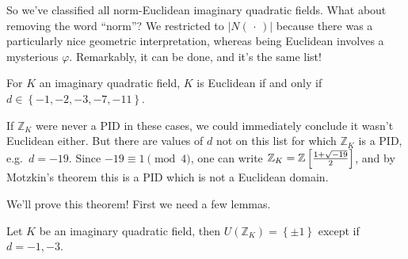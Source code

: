\begin{remark}

So we've classified all norm-Euclidean imaginary quadratic fields. What
about removing the word ``norm''? We restricted to
\({\left\lvert {N({\,\cdot\,})} \right\rvert}\) because there was a
particularly nice geometric interpretation, whereas being Euclidean
involves a mysterious \(\varphi\). Remarkably, it can be done, and it's
the same list!

\end{remark}

\begin{theorem}[Motzkin]

For \(K\) an imaginary quadratic field, \(K\) is Euclidean if and only
if \(d\in \left\{{-1,-2,-3,-7,-11}\right\}\).

\end{theorem}

\begin{remark}

If \({\mathbb{Z}}_K\) were never a PID in these cases, we could
immediately conclude it wasn't Euclidean either. But there are values of
\(d\) not on this list for which \({\mathbb{Z}}_K\) is a PID,
e.g.~\(d=-19\). Since \(-19 \equiv 1 \pmod 4\), one can write
\({\mathbb{Z}}_K = {\mathbb{Z}}\left[ {1 + \sqrt{-19} \over 2}\right]\),
and by Motzkin's theorem this is a PID which is not a Euclidean domain.

\end{remark}

\begin{remark}

We'll prove this theorem! First we need a few lemmas.

\end{remark}

\begin{lemma}

Let \(K\) be an imaginary quadratic field, then
\(U({\mathbb{Z}}_K) = \left\{{\pm 1 }\right\}\) except if \(d=-1, -3\).

\end{lemma}

